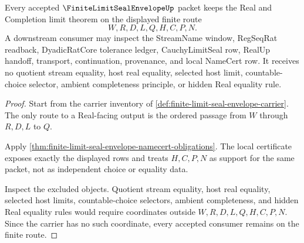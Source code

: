 \begin{theorem}
\label{thm:finite-limit-seal-envelope-nonchoice-boundary}
Every accepted $\FiniteLimitSealEnvelopeUp$ packet keeps the Real and Completion limit theorem on the displayed finite route
$$
W,R,D,L,Q,H,C,P,N.
$$
A downstream consumer may inspect the StreamName window, RegSeqRat readback, DyadicRatCore tolerance ledger, CauchyLimitSeal row, RealUp handoff, transport, continuation, provenance, and local NameCert row. It receives no quotient stream equality, host real equality, selected host limit, countable-choice selector, ambient completeness principle, or hidden Real equality rule.
\end{theorem}
\begin{proof}
Start from the carrier inventory of \autoref{def:finite-limit-seal-envelope-carrier}. The only route to a Real-facing output is the ordered passage from $W$ through $R,D,L$ to $Q$.

Apply \autoref{thm:finite-limit-seal-envelope-namecert-obligations}. The local certificate exposes exactly the displayed rows and treats $H,C,P,N$ as support for the same packet, not as independent choice or equality data.

Inspect the excluded objects. Quotient stream equality, host real equality, selected host limits, countable-choice selectors, ambient completeness, and hidden Real equality rules would require coordinates outside $W,R,D,L,Q,H,C,P,N$. Since the carrier has no such coordinate, every accepted consumer remains on the finite route.
\end{proof}

